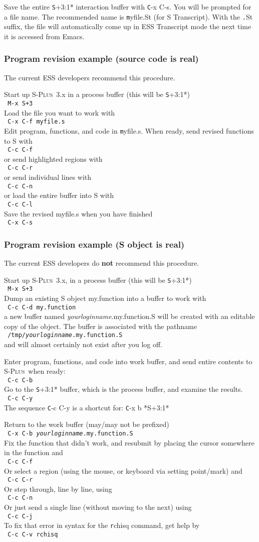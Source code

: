 \documentclass{article}
\newcommand*{\Splus}{\textsc{S-Plus}}
\newcommand{\elcode}[1]{\\{\texttt{\hspace*{2em} #1}}\\}
\begin{document}
Save the entire {\texttt *S+3:1*} interaction buffer with {\texttt C-x C-s}.  You
will be prompted for a file name.  The recommended name is
{\texttt myfile.St} (for S Transcript).  With the {\texttt *.St} suffix,
the file will automatically come up in ESS
Transcript mode the next time it is accessed from Emacs.


\subsubsection{Program revision example (source code is real)}
The current ESS developers recommend this procedure.

\noindent
Start up \Splus~3.x in a process buffer (this will be {\texttt *S+3:1*})
  \elcode{M-x S+3}
Load the file you want to work with
  \elcode{C-x C-f myfile.s}
Edit program, functions, and code in {\texttt myfile.s}.
When ready, send revised functions to S with
  \elcode{C-c C-f}
or send highlighted regions with
  \elcode{C-c C-r}
or send individual lines with
  \elcode{C-c C-n}
or load the entire buffer into S with
  \elcode{C-c C-l}
Save the revised myfile.s when you have finished
  \elcode{C-x C-s}

\subsubsection{Program revision example (S object is real)}
The current ESS developers do {\bf not} recommend this procedure.

\noindent
Start up \Splus~3.x, in a process buffer (this will be {\texttt *S+3:1*}) 
  \elcode{M-x S+3}
Dump an existing S object my.function into a buffer to work with
  \elcode{C-c C-d my.function}
a new buffer named \textit{yourloginname}.my.function.S will be created with
an editable copy of the object.  The buffer is associated with the
pathname
 \elcode{/tmp/\textit{yourloginname}.my.function.S}
and will almost certainly not exist after you log off.

Enter program, functions, and code into work buffer,
and send entire contents to \Splus\ when ready:
  \elcode{C-c C-b}
Go to the {\texttt *S+3:1*} buffer, which is the process buffer, and examine
the results.
  \elcode{C-c C-y}
The sequence {\texttt C-c C-y} is a shortcut for:  {\texttt C-x b *S+3:1*}

Return to the work buffer (may/may not be prefixed)
  \elcode{C-x C-b \textit{yourloginname}.my.function.S}
Fix the function that didn't work, and resubmit by
placing the cursor somewhere in the function and
  \elcode{C-c C-f}
Or select a region (using the mouse, or keyboard
via setting point/mark) and
  \elcode{C-c C-r}
Or step through, line by line, using
  \elcode{C-c C-n}
Or just send a single line (without moving to the next) using
  \elcode{C-c C-j}
To fix that error in syntax for the {\texttt rchisq} command, get help
by
  \elcode{C-c C-v rchisq}
\end{document}
